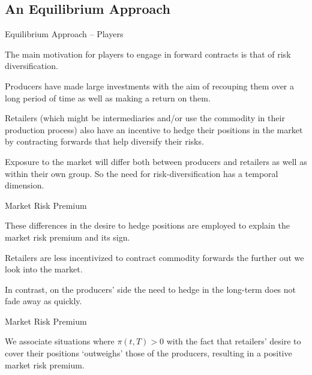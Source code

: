 \subsection{An Equilibrium Approach}

{Equilibrium Approach -- Players}







	
The main
motivation for players to engage in forward contracts is that of
risk diversification.


	
Producers have made large investments with the
aim of recouping them over a long period of time as well as making a
return on them.


	
Retailers (which might be intermediaries and/or use the commodity in
their production process) also have an incentive to hedge their
positions in the market by contracting forwards that help diversify
their risks.


	
Exposure to the market will differ both between producers and
retailers as well as within their own group.
So the need for risk-diversification has a temporal dimension.





{Market Risk Premium}







	These differences in the
desire to hedge positions are employed to explain the market risk premium and
its sign.


	Retailers are less incentivized to contract commodity forwards
the further out we look into the market.


	In contrast, on the producers' side the need to hedge in the long-term
does not fade away as quickly.





{Market Risk Premium}






	We associate situations where
$\pi(t,T)>0$ with the fact that retailers' desire to cover their
positions `outweighs' those of the producers, resulting in a
positive market risk premium.


